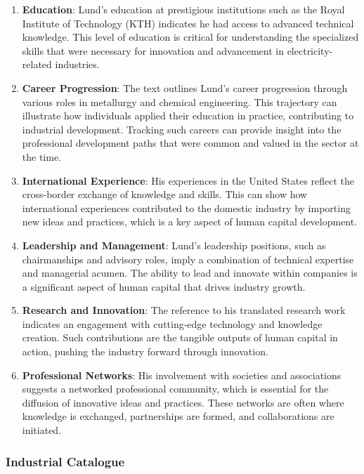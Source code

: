 \documentclass[
]{article}
\begin{document}
\begin{enumerate}
\def\labelenumi{\arabic{enumi}.}
\item
  \textbf{Education}: Lund's education at prestigious institutions such
  as the Royal Institute of Technology (KTH) indicates he had access to
  advanced technical knowledge. This level of education is critical for
  understanding the specialized skills that were necessary for
  innovation and advancement in electricity-related industries.
\item
  \textbf{Career Progression}: The text outlines Lund's career
  progression through various roles in metallurgy and chemical
  engineering. This trajectory can illustrate how individuals applied
  their education in practice, contributing to industrial development.
  Tracking such careers can provide insight into the professional
  development paths that were common and valued in the sector at the
  time.
\item
  \textbf{International Experience}: His experiences in the United
  States reflect the cross-border exchange of knowledge and skills. This
  can show how international experiences contributed to the domestic
  industry by importing new ideas and practices, which is a key aspect
  of human capital development.
\item
  \textbf{Leadership and Management}: Lund's leadership positions, such
  as chairmanships and advisory roles, imply a combination of technical
  expertise and managerial acumen. The ability to lead and innovate
  within companies is a significant aspect of human capital that drives
  industry growth.
\item
  \textbf{Research and Innovation}: The reference to his translated
  research work indicates an engagement with cutting-edge technology and
  knowledge creation. Such contributions are the tangible outputs of
  human capital in action, pushing the industry forward through
  innovation.
\item
  \textbf{Professional Networks}: His involvement with societies and
  associations suggests a networked professional community, which is
  essential for the diffusion of innovative ideas and practices. These
  networks are often where knowledge is exchanged, partnerships are
  formed, and collaborations are initiated.
\end{enumerate}

\hypertarget{industrial-catalogue}{%
\subsubsection{Industrial Catalogue}\label{industrial-catalogue}}
\end{document}
